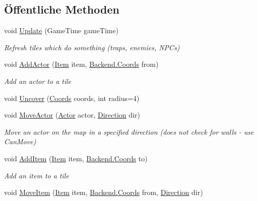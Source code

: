 \subsection*{Öffentliche Methoden}
\begin{DoxyCompactItemize}
\item 
void \hyperlink{class_gruppe22_1_1_backend_1_1_map_a3f3723458566403e40673d4e757efb76}{Update} (Game\-Time game\-Time)
\begin{DoxyCompactList}\small\item\em Refresh tiles which do something (traps, enemies, N\-P\-Cs) \end{DoxyCompactList}\item 
void \hyperlink{class_gruppe22_1_1_backend_1_1_map_a120d2585d2cc5279322670a1274c820a}{Add\-Actor} (\hyperlink{class_gruppe22_1_1_backend_1_1_item}{Item} item, \hyperlink{class_gruppe22_1_1_backend_1_1_coords}{Backend.\-Coords} from)
\begin{DoxyCompactList}\small\item\em Add an actor to a tile \end{DoxyCompactList}\item 
void \hyperlink{class_gruppe22_1_1_backend_1_1_map_a0a3ac3d6dc5d341c9d1ebd9348d8db7a}{Uncover} (\hyperlink{class_gruppe22_1_1_backend_1_1_coords}{Coords} coords, int radius=4)
\item 
void \hyperlink{class_gruppe22_1_1_backend_1_1_map_ab7a2c3d607228ddb4aca3f28d6802f5a}{Move\-Actor} (\hyperlink{class_gruppe22_1_1_backend_1_1_actor}{Actor} actor, \hyperlink{namespace_gruppe22_1_1_backend_a2d53d5d14b8ea0951ba6971e5da1ebf5}{Direction} dir)
\begin{DoxyCompactList}\small\item\em Move an actor on the map in a specified direction (does not check for walls -\/ use Can\-Move) \end{DoxyCompactList}\item 
void \hyperlink{class_gruppe22_1_1_backend_1_1_map_a1d4d36a2ab918a0c37db26195508a0e5}{Add\-Item} (\hyperlink{class_gruppe22_1_1_backend_1_1_item}{Item} item, \hyperlink{class_gruppe22_1_1_backend_1_1_coords}{Backend.\-Coords} to)
\begin{DoxyCompactList}\small\item\em Add an item to a tile \end{DoxyCompactList}\item 
void \hyperlink{class_gruppe22_1_1_backend_1_1_map_a2bb2e356f5d269823152b90b6460dc96}{Move\-Item} (\hyperlink{class_gruppe22_1_1_backend_1_1_item}{Item} item, \hyperlink{class_gruppe22_1_1_backend_1_1_coords}{Backend.\-Coords} from, \hyperlink{namespace_gruppe22_1_1_backend_a2d53d5d14b8ea0951ba6971e5da1ebf5}{Direction} dir)

\end{DoxyCompactItemize}
